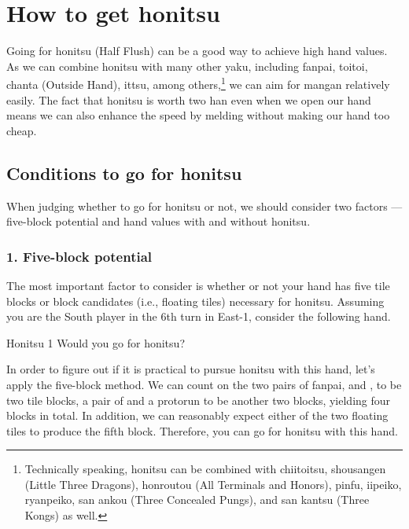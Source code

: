 \newpage
\section{How to get {\jap honitsu}}\label{sec:hon}
Going for {\jap honitsu} (Half Flush) can be a good way to achieve high hand values. As we can combine {\jap honitsu} with many other {\jap yaku}, including {\jap fanpai}, {\jap toitoi}, {\jap chanta} (Outside Hand), {\jap ittsu}, among others,\footnote{Technically speaking, {\jap honitsu} can be combined with {\jap chiitoitsu}, {\jap shousangen} (Little Three Dragons), {\jap honroutou} (All Terminals and Honors), {\jap pinfu}, {\jap iipeiko}, {\jap ryanpeiko}, {\jap san ankou} (Three Concealed Pungs), and {\jap san kantsu} (Three Kongs) as well.}
we can aim for {\jap mangan} relatively easily.
The fact that {\jap honitsu} is worth two {\jap han} even when we open our hand means we can also enhance the speed by melding without making our hand too cheap.

\subsection{Conditions to go for {\jap honitsu}}
When judging whether to go for {\jap honitsu} or not, we should consider two factors --- five-block potential and hand values with and without {\jap honitsu}.

\subsubsection{1. Five-block potential}
\noindent The most important factor to consider is whether or not your hand has  five tile blocks or block candidates (i.e., floating tiles) necessary for {\jap honitsu}. Assuming you are the South player in the 6th turn in East-1, consider the following hand.

\begin{itembox}[r]{{\jap Honitsu} 1}
\bp
{}\dong\dong\xi\zhong\zhong
\ep
\vspace{-10pt}Would you go for {\jap honitsu}? \vspace{-5pt}
\end{itembox}
\noindent
In order to figure out if it is practical to pursue {\jap honitsu} with this hand, let's apply the five-block method.
\emj
We can count on the two pairs of {\jap fanpai}, {\LARGE\dong\dong} and {\LARGE\zhong\zhong}, to be two tile blocks, a pair of {\LARGE{}} and a protorun {\LARGE{}} to be another two blocks, yielding four blocks in total. In addition, we can reasonably expect either of the two floating tiles {\LARGE\xi}{\LARGE{}} to produce the fifth block. Therefore, you can go for {\jap honitsu} with this hand.

